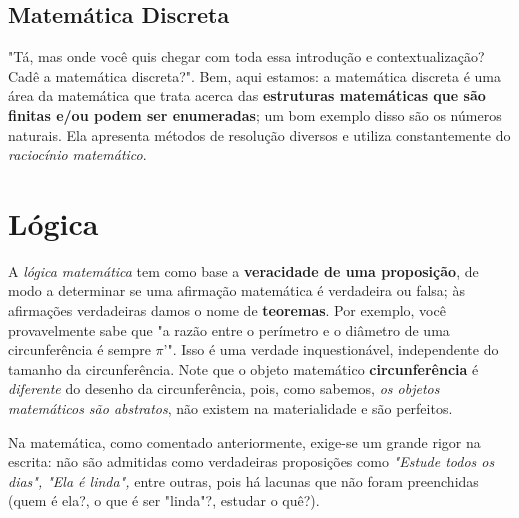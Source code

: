 \documentclass{article}
\begin{document}
\subsection{Matemática Discreta}
"Tá, mas onde você quis chegar com toda essa introdução e contextualização? Cadê a matemática discreta?". Bem, aqui estamos: a matemática discreta é uma área da matemática que trata acerca das \textbf{estruturas matemáticas que são finitas e/ou podem ser enumeradas}; um bom exemplo disso são os números naturais. Ela apresenta métodos de resolução diversos e utiliza constantemente do \emph{raciocínio matemático}.

\section{Lógica}

A \emph{lógica matemática} tem como base a \textbf{veracidade de uma proposição}, de modo a determinar se uma afirmação matemática é verdadeira ou falsa; às afirmações verdadeiras damos o nome de \textbf{teoremas}. Por exemplo, você provavelmente sabe que "a razão entre o perímetro e o diâmetro de uma circunferência é sempre $\pi$'". 
Isso é uma verdade inquestionável, independente do tamanho da circunferência. Note que o objeto matemático \textbf{circunferência} é \emph{diferente} do desenho da circunferência, pois, como sabemos, \emph{os objetos matemáticos são abstratos}, não existem na materialidade e são perfeitos.
\par
Na matemática, como comentado anteriormente, exige-se um grande rigor na escrita: não são admitidas como verdadeiras proposições como \emph{"Estude todos os dias", "Ela é linda",} entre outras, pois há lacunas que não foram preenchidas (quem é ela?, o que é ser "linda"?, estudar o quê?).
\end{document}
